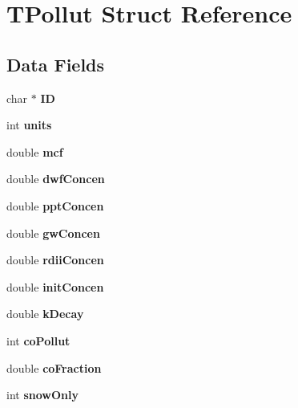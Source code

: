 \hypertarget{struct_t_pollut}{}\section{T\+Pollut Struct Reference}
\label{struct_t_pollut}
\subsection*{Data Fields}
\begin{DoxyCompactItemize}
\item 
\mbox{\label{struct_t_pollut_a63756a4a33a8c806e584babb52907653}} 
char $\ast$ {\bfseries ID}
\item 
\mbox{\label{struct_t_pollut_ad208aa54e8b58365041234df857bbd04}} 
int {\bfseries units}
\item 
\mbox{\label{struct_t_pollut_aba6dd08e496796e8242149b36ba22b94}} 
double {\bfseries mcf}
\item 
\mbox{\label{struct_t_pollut_a2f2f1b920a6a64f5aeebf33a7a0f4215}} 
double {\bfseries dwf\+Concen}
\item 
\mbox{\label{struct_t_pollut_a2b86d4823c1a395e0655b3a8dd37782c}} 
double {\bfseries ppt\+Concen}
\item 
\mbox{\label{struct_t_pollut_a1c380ea70a0f63dd731f8a5f0e61d48d}} 
double {\bfseries gw\+Concen}
\item 
\mbox{\label{struct_t_pollut_aa7c2242b8d1d441bf36d15d88175827b}} 
double {\bfseries rdii\+Concen}
\item 
\mbox{\label{struct_t_pollut_afeafdeaaf607aea3257cc2d003eeccc6}} 
double {\bfseries init\+Concen}
\item 
\mbox{\label{struct_t_pollut_ae7c5b1dc2eb898ea84b37d6411ce7cca}} 
double {\bfseries k\+Decay}
\item 
\mbox{\label{struct_t_pollut_a59e8f41afba178fe5f140e949a1d0ea7}} 
int {\bfseries co\+Pollut}
\item 
\mbox{\label{struct_t_pollut_a91dc36bdf3cc93d258a6596a3bc60a73}} 
double {\bfseries co\+Fraction}
\item 
\mbox{\label{struct_t_pollut_ab5a9bef246e5a47672a1f68c3dbb0ec0}} 
int {\bfseries snow\+Only}
\end{DoxyCompactItemize}


